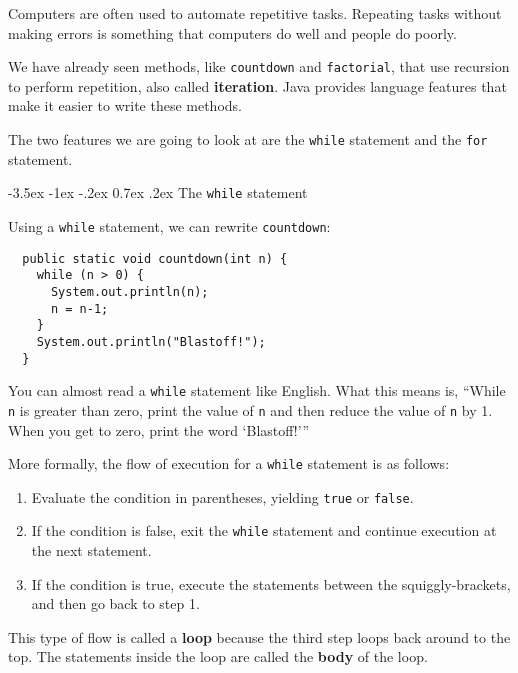 \documentclass{book}
\makeatletter
\renewcommand{\section}{\@startsection 
    {section} {1} {0mm}%
    {-3.5ex \@plus -1ex \@minus -.2ex}%
    {0.7ex \@plus.2ex}%
    {\normalfont\Large\bfseries}}
\makeatother
\begin{document}
Computers are often used to automate repetitive tasks.  Repeating
tasks without making errors is something that
computers do well and people do poorly.

We have already seen methods, like {\tt countdown} and {\tt factorial},
 that use recursion to perform repetition, also called
{\bf iteration}.  Java provides language features that make
it easier to write these methods.

The two features we are going to look at are the {\tt while}
statement and the {\tt for} statement.

\section{The {\tt while} statement}

Using a {\tt while} statement, we can rewrite {\tt countdown}:

\begin{verbatim}
  public static void countdown(int n) {
    while (n > 0) {
      System.out.println(n);
      n = n-1;
    }
    System.out.println("Blastoff!");
  }
\end{verbatim}
%
You can almost read a {\tt while} statement like
English.  What this means is, ``While {\tt n} is greater than
zero, print the value of {\tt n} and then reduce
the value of {\tt n} by 1.  When you get to zero, print the
word `Blastoff!'''

More formally, the flow of execution for a {\tt while} statement
is as follows:

\begin{enumerate}

\item Evaluate the condition in parentheses, yielding {\tt true}
or {\tt false}.

\item If the condition is false, exit the {\tt while} statement
and continue execution at the next statement.

\item If the condition is true, execute the statements
between the squiggly-brackets, and then go back to step 1.

\end{enumerate}

This type of flow is called a {\bf loop} because the third step loops
back around to the top.  The statements inside the loop are called
the {\bf body} of the loop.
\end{document}
